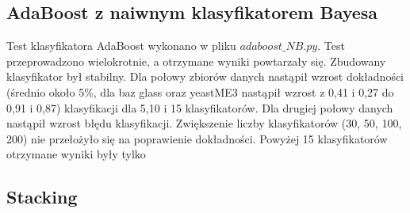 \subsection{AdaBoost z naiwnym klasyfikatorem Bayesa}
Test klasyfikatora AdaBoost wykonano w pliku $adaboost\_NB.py$. Test przeprowadzono wielokrotnie, a otrzymane wyniki powtarzały się. Zbudowany klasyfikator był stabilny. Dla połowy zbiorów danych nastąpił wzrost dokładności (średnio około 5\%, dla baz glass oraz yeastME3 nastąpił wzrost z 0,41 i 0,27 do 0,91 i 0,87) klasyfikacji dla 5,10 i 15 klasyfikatorów. Dla drugiej połowy danych nastąpił wzrost błędu klasyfikacji. Zwiększenie liczby klasyfikatorów (30, 50, 100, 200) nie przełożyło się na poprawienie dokładności. Powyżej 15 klasyfikatorów otrzymane wyniki były tylko 



\subsection{Stacking}

